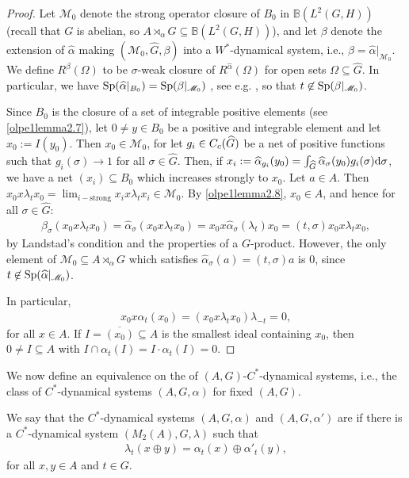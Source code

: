 \begin{proof}
Let $\mathscr{M}_0$ denote the strong operator closure of $B_0$ in $\mathbb{B}(L^2(G,H))$ (recall that $G$ is abelian, so $A \rtimes_\alpha G \subseteq \mathbb{B}(L^2(G,H))$), and let $\beta$ denote the extension of $\hat \alpha$ making $(\mathscr{M}_0, \hat G, \beta)$ into a $W^*$-dynamical system, i.e., $\beta = \hat \alpha|_{\mathscr{M}_0}$. We define $R^{\beta}(\Omega)$ to be $\sigma$-weak closure of $R^{\hat \alpha}(\Omega)$ for open sets $\Omega \subseteq \hat G$. In particular, we have $\mathrm{Sp}(\widehat{\alpha}|_{B_0})= \mathrm{Sp}(\beta|_{\mathscr{M}_0})$ , see e.g. \cite[Proposition 8.8.9]{pedersenalgauto}, so that $t \not \in \mathrm{Sp}(\beta|_{\mathscr{M}_0})$.

Since $B_0$ is the closure of a set of integrable positive elements (see \cref{olpe1lemma2.7}), let $0 \neq y \in B_0$ be a positive and integrable element and let $x_0 := I(y_0)$. Then $x_0 \in \mathscr{M}_0$, for let $g_i \in C_c(\widehat{G})$ be a net of positive functions such that $g_i(\sigma)\to 1$ for all $\sigma \in \hat G$. Then, if $x_i := \widehat{\alpha}_{g_i}(y_0) = \int_{\widehat{G}} \widehat{\alpha}_{\sigma}(y_0) g_i(\sigma) \mathrm{d} \sigma $, we have a net $(x_i) \subseteq B_0$ which increases strongly to $x_0$. Let $a \in A$. Then $x_0 x \lambda_t x_0 = \lim_{i-\text{strong}} x_i x \lambda_t x_i \in \mathscr{M}_0$. By \cref{olpe1lemma2.8}, $x_0 \in A$, and hence for all $\sigma \in \hat G$:
\begin{align*}
	\beta_{\sigma}(x_0 x \lambda_t x_0) = \hat \alpha_\sigma( x_0 x \lambda_t x_0) = x_0 x \hat \alpha_\sigma(\lambda_t) x_0 =  (t,\sigma) x_0 x \lambda_t x_0,
\end{align*}
by Landstad's condition and the properties of a $G$-product. However, the only element of $\mathscr{M}_0 \subseteq A \rtimes_\alpha G$ which satisfies $\hat \alpha_\sigma (a)=(t,\sigma) a$ is $0$, since $t \not \in \mathrm{Sp}(\widehat{\alpha} |_{\mathscr{M}_0})$.

In particular,
\begin{align*}
	x_0 x \alpha_t(x_0) = (x_0 x \lambda_t x_0) \lambda_{-t} = 0,
\end{align*}
for all $x \in A$. If $I = \overline{(x_0)} \subseteq A$ is the smallest ideal containing $x_0$, then $0 \neq I \subseteq A$ with $I \cap \alpha_t(I)=I\cdot\alpha_t(I)=0$.
\end{proof}
We now define an equivalence on the of $(A,G)$-$C^*$-dynamical systems, i.e., the class of $C^*$-dynamical systems $(A, G, \alpha)$ for fixed $(A,G)$. 
\begin{definition}
	We say that the $C^*$-dynamical systems $(A,G,\alpha)$ and $(A, G, \alpha')$ are  if there is a $C^*$-dynamical system $(M_2(A), G, \lambda)$ such that
	\begin{align*}
		\lambda_t (x \oplus y) = \alpha_t(x) \oplus \alpha'_t(y),
	\end{align*}
	for all $x,y \in A$ and $t \in G$.
\end{definition}
